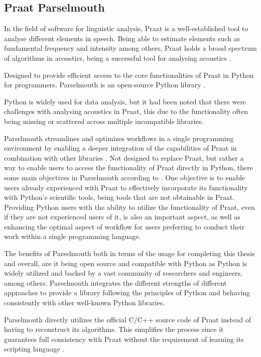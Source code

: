 \subsection{Praat Parselmouth}

In the field of software for linguistic analysis, Praat is a well-established tool to analyse different elements in speech. Being able to estimate elements such as fundamental frequency and intensity among others, Praat holds a broad spectrum of algorithms in acoustics, being a successful tool for analysing acoustics \autocite{Jadoul2024}.

Designed to provide efficient access to the core functionalities of Praat in Python for programmers, Parselmouth is an open-source Python library \autocite{Jadoul2018}.

Python is widely used for data analysis, but it had been noted that there were challenges with analysing acoustics in Praat, this due to the functionality often being missing or scattered across multiple incompatible libraries.

Parselmouth streamlines and optimizes workflows in a single programming environment by enabling a deeper integration of the capabilities of Praat in combination with other libraries \autocite{Jadoul2024}. Not designed to replace Praat, but rather a way to enable users to access the functionality of Praat directly in Python, there some main objectives in Parselmouth according to \textcite{Jadoul2018}.
One objective is to enable users already experienced with Praat to effectively incorporate its functionality with Python’s scientific tools, being tools that are not obtainable in Praat.
Providing Python users with the ability to utilize the functionality of Praat, even if they are not experienced users of it, is also an important aspect, as well as enhancing the optimal aspect of workflow for users preferring to conduct their work within a single programming language.
 
The benefits of Parselmouth both in terms of the usage for completing this thesis and overall, are it being open source and compatible with Python as Python is widely utilized and backed by a vast community of researchers and engineers, among others. Parselmouth integrates the different strengths of different approaches to provide a library following the principles of Python and behaving consistently with other well-known Python libraries.

Parselmouth directly utilizes the official C/C++ source code of Praat instead of having to reconstruct its algorithms. This simplifies the process since it guarantees full consistency with Praat without the requirement of learning its scripting language \autocite{Jadoul2018}.


